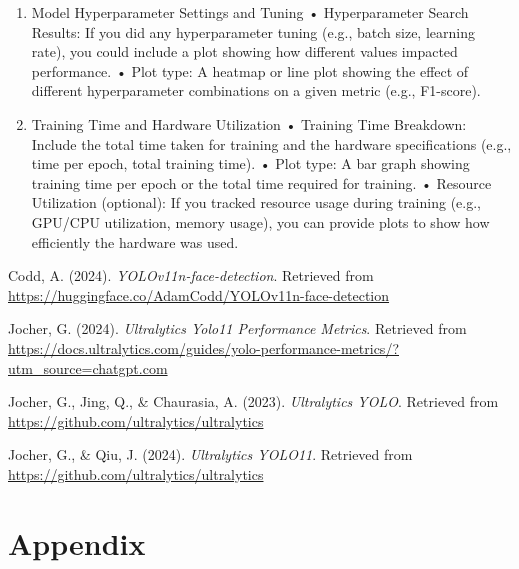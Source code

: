 \documentclass[
  man,floatsintext]{apa6}
\newlength{\cslhangindent}
\newenvironment{CSLReferences}[2] %
 {\begin{list}{}{%
  \setlength{\itemindent}{0pt}
  \setlength{\leftmargin}{0pt}
  \setlength{\parsep}{0pt}
  \ifodd #1
   \setlength{\leftmargin}{\cslhangindent}
   \setlength{\itemindent}{-1\cslhangindent}
  \fi
  \setlength{\itemsep}{#2\baselineskip}}}
 {\end{list}}
\begin{document}
\begin{enumerate}
\def\labelenumi{\arabic{enumi}.}
\setcounter{enumi}{3}
\item
  Model Hyperparameter Settings and Tuning
  • Hyperparameter Search Results: If you did any hyperparameter tuning (e.g., batch size, learning rate), you could include a plot showing how different values impacted performance.
  • Plot type: A heatmap or line plot showing the effect of different hyperparameter combinations on a given metric (e.g., F1-score).
\item
  Training Time and Hardware Utilization
  • Training Time Breakdown: Include the total time taken for training and the hardware specifications (e.g., time per epoch, total training time).
  • Plot type: A bar graph showing training time per epoch or the total time required for training.
  • Resource Utilization (optional): If you tracked resource usage during training (e.g., GPU/CPU utilization, memory usage), you can provide plots to show how efficiently the hardware was used.
  \newpage
\end{enumerate}

\begingroup
\setlength{\parindent}{-0.5in}
\setlength{\leftskip}{0.5in}

\label{refs}
\begin{CSLReferences}{1}{0}
Codd, A. (2024). \emph{{YOLOv11n-face-detection}}. Retrieved from \url{https://huggingface.co/AdamCodd/YOLOv11n-face-detection}

Jocher, G. (2024). \emph{Ultralytics {Yolo11 Performance Metrics}}. Retrieved from \url{https://docs.ultralytics.com/guides/yolo-performance-metrics/?utm_source=chatgpt.com}

Jocher, G., Jing, Q., \& Chaurasia, A. (2023). \emph{Ultralytics {YOLO}}. Retrieved from \url{https://github.com/ultralytics/ultralytics}

Jocher, G., \& Qiu, J. (2024). \emph{Ultralytics {YOLO11}}. Retrieved from \url{https://github.com/ultralytics/ultralytics}

\end{CSLReferences}

\endgroup

\newpage

\section{Appendix}\label{appendix}
\end{document}

